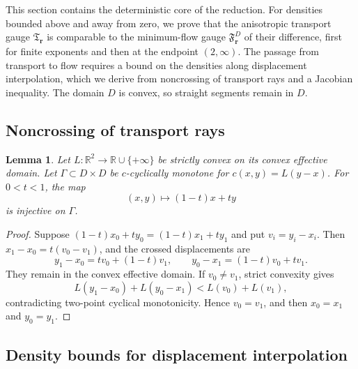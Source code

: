 \documentclass[11pt]{article}
\newtheorem{lemma}[lemma]{Lemma}
\theoremstyle{definition}
\theoremstyle{remark}
\numberwithin{equation}{section}
\newcommand{\R}{\mathbb R}
\begin{document}
This section contains the deterministic core of the reduction. For
densities bounded above and away from zero, we prove that the
anisotropic transport gauge $\mathfrak T_{\boldsymbol r}$ is comparable
to the minimum-flow gauge $\mathfrak F_{\boldsymbol r}^D$ of their
difference, first for finite exponents and then at the endpoint
$(2,\infty)$. The passage from transport to flow requires a bound on
the densities along displacement interpolation, which we derive from
noncrossing of transport rays and a Jacobian inequality. The domain
$D$ is convex, so straight segments remain in $D$.

\subsection{Noncrossing of transport rays}

\begin{lemma}
\label{red:lem:noncrossing}
Let $L:\R^2\to\R\cup\{+\infty\}$ be strictly convex on its convex effective
domain.  Let $\Gamma\subset D\times D$ be $c$-cyclically monotone for
$c(x,y)=L(y-x)$.  For $0<t<1$, the map
\[
 (x,y)\longmapsto(1-t)x+ty
\]
is injective on $\Gamma$.
\end{lemma}

\begin{proof}
Suppose $(1-t)x_0+ty_0=(1-t)x_1+ty_1$ and put $v_i=y_i-x_i$.
Then $x_1-x_0=t(v_0-v_1)$, and the crossed displacements are
\[
 y_1-x_0=tv_0+(1-t)v_1,
 \qquad
 y_0-x_1=(1-t)v_0+tv_1.
\]
They remain in the convex effective domain.  If $v_0\ne v_1$, strict
convexity gives
\[
 L(y_1-x_0)+L(y_0-x_1)<L(v_0)+L(v_1),
\]
contradicting two-point cyclical monotonicity.  Hence $v_0=v_1$, and then
$x_0=x_1$ and $y_0=y_1$.
\end{proof}

\subsection{Density bounds for displacement interpolation}
\end{document}

